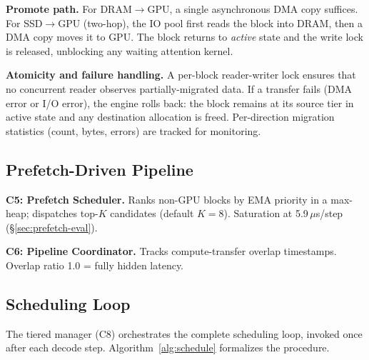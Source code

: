 \documentclass[conference]{IEEEtran}
\begin{document}
\textbf{Promote path.} For DRAM$\to$GPU, a single asynchronous DMA copy suffices. For SSD$\to$GPU (two-hop), the IO pool first reads the block into DRAM, then a DMA copy moves it to GPU. The block returns to \emph{active} state and the write lock is released, unblocking any waiting attention kernel.

\textbf{Atomicity and failure handling.} A per-block reader-writer lock ensures that no concurrent reader observes partially-migrated data. If a transfer fails (DMA error or I/O error), the engine rolls back: the block remains at its source tier in active state and any destination allocation is freed. Per-direction migration statistics (count, bytes, errors) are tracked for monitoring.

\subsection{Prefetch-Driven Pipeline}
\label{sec:pipeline}

\textbf{C5: Prefetch Scheduler.} Ranks non-GPU blocks by EMA priority in a max-heap; dispatches top-$K$ candidates (default $K{=}8$). Saturation at 5.9\,$\mu$s/step (\S\ref{sec:prefetch-eval}).

\textbf{C6: Pipeline Coordinator.} Tracks compute-transfer overlap timestamps. Overlap ratio 1.0 = fully hidden latency.

\subsection{Scheduling Loop}

The tiered manager (C8) orchestrates the complete scheduling loop, invoked once after each decode step. Algorithm~\ref{alg:schedule} formalizes the procedure.
\end{document}
